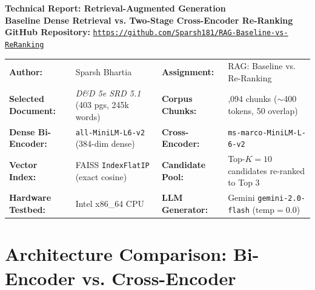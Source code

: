 \documentclass[10pt,a4paper]{article}
\begin{document}

\begin{center}
  {\LARGE\bfseries\color{primary} Technical Report: Retrieval-Augmented Generation}\\[2pt]
  {\large\bfseries\color{secondary} Baseline Dense Retrieval vs. Two-Stage Cross-Encoder Re-Ranking}\\[3pt]
  {\small\textbf{GitHub Repository:} \href{https://github.com/Sparsh181/RAG-Baseline-vs-ReRanking}{\color{secondary}\texttt{https://github.com/Sparsh181/RAG-Baseline-vs-ReRanking}}}\\[4pt]
\end{center}

\vspace{-4pt}
\begin{tcolorbox}[colframe=secondary, colback=lightbg, boxrule=0.8pt, arc=2mm, left=8pt, right=8pt, top=4pt, bottom=4pt]
\small
\begin{tabularx}{\textwidth}{@{} l >{\raggedright\arraybackslash}X l >{\raggedright\arraybackslash}X @{}}
  \textbf{Author:} & Sparsh Bhartia & \textbf{Assignment:} & RAG: Baseline vs. Re-Ranking \\
  \textbf{Selected Document:} & \textit{D\&D 5e SRD 5.1} (403 pgs, 245k words) & \textbf{Corpus Chunks:} & 1,094 chunks ($\sim$400 tokens, 50 overlap) \\
  \textbf{Dense Bi-Encoder:} & \texttt{\footnotesize all-MiniLM-L6-v2} (384-dim dense) & \textbf{Cross-Encoder:} & \texttt{\footnotesize ms-marco-MiniLM-L-6-v2} \\
  \textbf{Vector Index:} & FAISS \texttt{\footnotesize IndexFlatIP} (exact cosine) & \textbf{Candidate Pool:} & Top-$K = 10$ candidates re-ranked to Top 3 \\
  \textbf{Hardware Testbed:} & Intel x86\_64 CPU & \textbf{LLM Generator:} & Gemini \texttt{\footnotesize gemini-2.0-flash} ($\text{temp} = 0.0$) \\
\end{tabularx}
\end{tcolorbox}

\vspace{1pt}

\section{Architecture Comparison: Bi-Encoder vs. Cross-Encoder}
\end{document}
